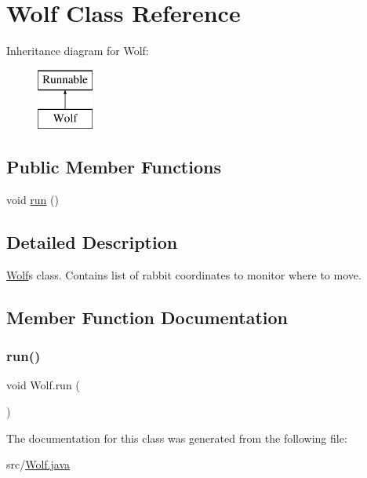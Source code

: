 \hypertarget{class_wolf}{}\section{Wolf Class Reference}
\label{class_wolf}
Inheritance diagram for Wolf\+:\begin{figure}[H]
\begin{center}
\leavevmode
\includegraphics[height=2.000000cm]{class_wolf}
\end{center}
\end{figure}
\subsection*{Public Member Functions}
\begin{DoxyCompactItemize}
\item 
void \hyperlink{class_wolf_ad13213f9167d4afd7abf79eacbf1e74a}{run} ()
\end{DoxyCompactItemize}


\subsection{Detailed Description}
\hyperlink{class_wolf}{Wolf}\textquotesingle{}s class. Contains list of rabbit coordinates to monitor where to move. 

\subsection{Member Function Documentation}
\mbox{\label{class_wolf_ad13213f9167d4afd7abf79eacbf1e74a}} 
\subsubsection{\texorpdfstring{run()}{run()}}
{\footnotesize\ttfamily void Wolf.\+run (\begin{DoxyParamCaption}{ }\end{DoxyParamCaption})}



The documentation for this class was generated from the following file\+:\begin{DoxyCompactItemize}
\item 
src/\hyperlink{_wolf_8java}{Wolf.\+java}\end{DoxyCompactItemize}
